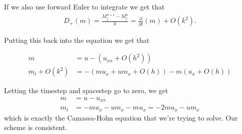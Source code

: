 If we also use forward Euler to integrate we get that
\begin{align}
D_+ (m) = \frac{M_j^{n+1} - M_j^n}{k} =  \frac{\partial}{\partial t} (m) + O(k^2).
\end{align}

Putting this back into the equation we get that

\begin{align}
m &= u - \left( u_{xx} + O\left(h^2\right) \right) \\
m_t  + O(k^2) &= - \left( m u_x + u m_x + O(h) \right) - m \left( u_x + O(h) \right)
\end{align}

Letting the timestep and spacestep go to zero, we get
\begin{align}
m &= u - u_{xx} \\
m_t &= - m u_x - u m_x - m u_x = - 2m u_x - u m_x
\end{align}
which is exactly the Camassa-Holm equation that we're trying to solve. Our scheme is consistent.